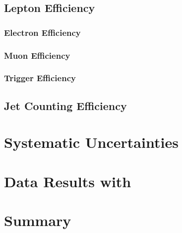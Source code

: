 \documentclass{cmspaper}
\begin{document}
    \subsection{Lepton Efficiency}
    \label{sec:efficiency}
        \subsubsection{Electron Efficiency}
        \label{sec:eff_electron}
        \subsubsection{Muon Efficiency}
        \label{sec:eff_muon}
        \subsubsection{Trigger Efficiency}
        \label{sec:eff_trigger}
    \subsection{Jet Counting Efficiency}

\section{Systematic Uncertainties}
  \label{sec:systematics}

  \clearpage

\section{Data Results with \intlumi}
  \label{sec:dataresults}

\section{Summary}
    \label{sec:summary}




\end{document}
